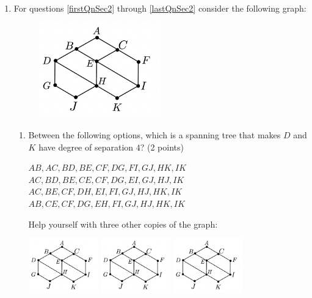 \documentclass[12pt]{exam}
\begin{document}
\begin{enumerate}
\begin{enumerate}
\begin{figure}[h!]
    
    
    
    
    \end{figure}
\end{enumerate}
    \vfill
    \newpage
    \item For questions \ref{firstQnSec2} through \ref{lastQnSec2} consider the following graph:\par
\begin{figure}[h]
    \centering
    \includegraphics[width=0.5\textwidth]{graph1.png}
\end{figure}
\begin{enumerate}
    \item \label{firstQnSec2}Between the following options, which is a spanning tree that makes $D$ and $K$ have degree of separation $4$? (2 points)
    \begin{checkboxes}
        \choice $AB,AC,BD,BE,CF,DG,FI,GJ,HK,IK$
        \choice $AC,BD,BE,CE,CF,DG,EI,GJ,HJ,IK$
        \choice $AC,BE,CF,DH,EI,FI,GJ,HJ,HK,IK$
        \choice $AB,CE,CF,DG,EH,FI,GJ,HJ,HK,IK$
    \end{checkboxes}
    Help yourself with three other copies of the graph:
    \begin{center}
    \includegraphics[width=0.25\textwidth]{graph1.png}
    \includegraphics[width=0.25\textwidth]{graph1.png}
    \includegraphics[width=0.25\textwidth]{graph1.png}

\end{center}
\end{enumerate}
\end{enumerate}
\end{document}
